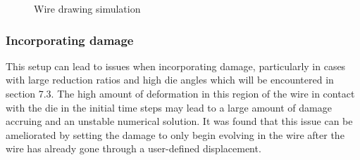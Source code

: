 \documentclass[sn-mathphys,Numbered,draft]{sn-jnl}%
\begin{document}
\begin{figure}[t!]
	\centering
	  \qquad
        \qquad
		
		\caption{Wire drawing simulation}
	\label{label_for_entire_figure}
\end{figure}
\FloatBarrier

\subsubsection{Incorporating damage}

This setup can lead to issues when incorporating damage, particularly in cases with large reduction ratios and high die angles which will be encountered in section 7.3. The high amount of deformation in this region of the wire in contact with the die in the initial time steps may lead to a large amount of damage accruing and an unstable numerical solution. It was found that this issue can be ameliorated by setting the damage to only begin evolving in the wire after the wire has already gone through a user-defined displacement. 
\end{document}
